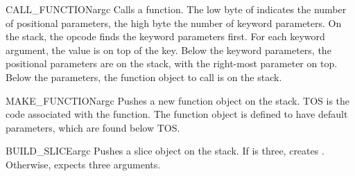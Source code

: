 \begin{funcdesc}{CALL_FUNCTION}{argc}
Calls a function.  The low byte of  indicates the number of
positional parameters, the high byte the number of keyword parameters.
On the stack, the opcode finds the keyword parameters first.  For each
keyword argument, the value is on top of the key.  Below the keyword
parameters, the positional parameters are on the stack, with the
right-most parameter on top.  Below the parameters, the function object
to call is on the stack.
\end{funcdesc}

\begin{funcdesc}{MAKE_FUNCTION}{argc}
Pushes a new function object on the stack.  TOS is the code associated
with the function.  The function object is defined to have 
default parameters, which are found below TOS.
\end{funcdesc}

\begin{funcdesc}{BUILD_SLICE}{argc}
Pushes a slice object on the stack.  If  is three, creates
.  Otherwise, expects three arguments.
\end{funcdesc}


